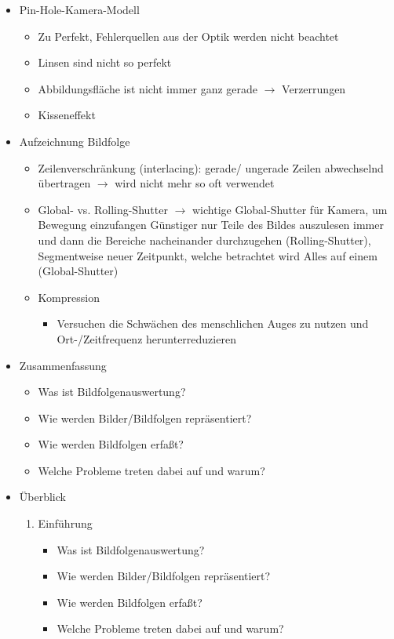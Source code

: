 \documentclass{report}
\begin{document}
\begin{itemize}
		\item Pin-Hole-Kamera-Modell
		\begin{itemize}
			\item Zu Perfekt, Fehlerquellen aus der Optik werden nicht beachtet
			\item Linsen sind nicht so perfekt
			\item Abbildungsfläche ist nicht immer ganz gerade $\rightarrow$ Verzerrungen
			\item Kisseneffekt
		\end{itemize}
		
		\item Aufzeichnung Bildfolge
		\begin{itemize}
			\item Zeilenverschränkung (interlacing): gerade/ ungerade Zeilen abwechselnd übertragen\newline
			$\rightarrow$ wird nicht mehr so oft verwendet
			\item Global- vs. Rolling-Shutter $\rightarrow$ wichtige Global-Shutter für Kamera, um Bewegung einzufangen\newline
			Günstiger nur Teile des Bildes auszulesen immer und dann die Bereiche nacheinander durchzugehen (Rolling-Shutter), Segmentweise neuer Zeitpunkt, welche betrachtet wird\newline
			Alles auf einem (Global-Shutter)
			\item Kompression
			\begin{itemize}
				\item Versuchen die Schwächen des menschlichen Auges zu nutzen und Ort-/Zeitfrequenz herunterreduzieren
			\end{itemize}
		\end{itemize}
	
		\item Zusammenfassung
		\begin{itemize}
			\item Was ist Bildfolgenauswertung?
			\item Wie werden Bilder/Bildfolgen repräsentiert?
			\item Wie werden Bildfolgen erfaßt?
			\item Welche Probleme treten dabei auf und warum?
		\end{itemize}
	
		\item Überblick
		\begin{enumerate}
			\item Einführung
			\begin{itemize}
				\item Was ist Bildfolgenauswertung?
				\item Wie werden Bilder/Bildfolgen repräsentiert?
				\item Wie werden Bildfolgen erfaßt?
				\item Welche Probleme treten dabei auf und warum?
			\end{itemize}
		

\end{enumerate}
\end{itemize}
\end{document}
